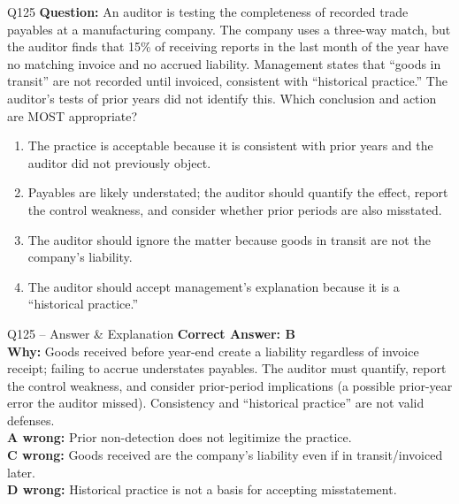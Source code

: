 \documentclass[aspectratio=169,10pt]{beamer}
\begin{document}
	\begin{frame}[t]{Q125}
		\small
		\textbf{Question:} An auditor is testing the completeness of recorded trade payables at a manufacturing company. The company uses a three-way match, but the auditor finds that 15\% of receiving reports in the last month of the year have no matching invoice and no accrued liability. Management states that ``goods in transit'' are not recorded until invoiced, consistent with ``historical practice.'' The auditor's tests of prior years did not identify this. Which conclusion and action are MOST appropriate?
		\begin{enumerate}[label=\Alph*.,itemsep=1pt,topsep=2pt]
			\item The practice is acceptable because it is consistent with prior years and the auditor did not previously object.
			\item Payables are likely understated; the auditor should quantify the effect, report the control weakness, and consider whether prior periods are also misstated.
			\item The auditor should ignore the matter because goods in transit are not the company's liability.
			\item The auditor should accept management's explanation because it is a ``historical practice.''
		\end{enumerate}
	\end{frame}
	
	\begin{frame}[t]{Q125 -- Answer \& Explanation}
		\small
		\textbf{Correct Answer: B} \\[4pt]
		\textbf{Why:} Goods received before year-end create a liability regardless of invoice receipt; failing to accrue understates payables. The auditor must quantify, report the control weakness, and consider prior-period implications (a possible prior-year error the auditor missed). Consistency and ``historical practice'' are not valid defenses. \\[4pt]
		\textbf{A wrong:} Prior non-detection does not legitimize the practice. \\[2pt]
		\textbf{C wrong:} Goods received are the company's liability even if in transit/invoiced later. \\[2pt]
		\textbf{D wrong:} Historical practice is not a basis for accepting misstatement.
	\end{frame}
	
\end{document}
